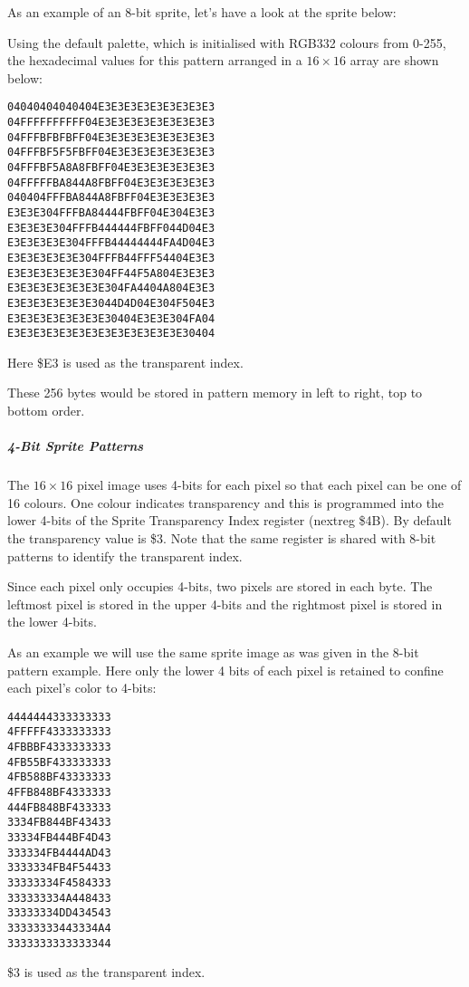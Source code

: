 As an example of an 8-bit sprite, let’s have a look at the sprite
below:

Using the default palette, which is initialised with RGB332 colours
from 0-255, the hexadecimal values for this pattern arranged in a
$16\times16$ array are shown below:

\begin{verbatim}
04040404040404E3E3E3E3E3E3E3E3E3
04FFFFFFFFFF04E3E3E3E3E3E3E3E3E3
04FFFBFBFBFF04E3E3E3E3E3E3E3E3E3
04FFFBF5F5FBFF04E3E3E3E3E3E3E3E3
04FFFBF5A8A8FBFF04E3E3E3E3E3E3E3
04FFFFFBA844A8FBFF04E3E3E3E3E3E3
040404FFFBA844A8FBFF04E3E3E3E3E3
E3E3E304FFFBA84444FBFF04E304E3E3
E3E3E3E304FFFB444444FBFF044D04E3
E3E3E3E3E304FFFB44444444FA4D04E3
E3E3E3E3E3E304FFFB44FFF54404E3E3
E3E3E3E3E3E3E304FF44F5A804E3E3E3
E3E3E3E3E3E3E3E304FA4404A804E3E3
E3E3E3E3E3E3E3044D4D04E304F504E3
E3E3E3E3E3E3E3E30404E3E3E304FA04
E3E3E3E3E3E3E3E3E3E3E3E3E3E30404

\end{verbatim}
Here \$E3 is used as the transparent index.

These 256 bytes would be stored in pattern memory in left to right,
top to bottom order.

\subparagraph{4-Bit Sprite Patterns}

The $16\times16$ pixel image uses 4-bits for each pixel so that each
pixel can be one of 16 colours. One colour indicates transparency and
this is programmed into the lower 4-bits of the Sprite Transparency
Index register (nextreg \$4B). By default the transparency value is
\$3. Note that the same register is shared with 8-bit patterns to
identify the transparent index.

Since each pixel only occupies 4-bits, two pixels are stored in each
byte. The leftmost pixel is stored in the upper 4-bits and the
rightmost pixel is stored in the lower 4-bits.

As an example we will use the same sprite image as was given in the
8-bit pattern example. Here only the lower 4 bits of each pixel is
retained to confine each pixel’s color to 4-bits:

\begin{verbatim}
4444444333333333
4FFFFF4333333333
4FBBBF4333333333
4FB55BF433333333
4FB588BF43333333
4FFB848BF4333333
444FB848BF433333
3334FB844BF43433
33334FB444BF4D43
333334FB4444AD43
3333334FB4F54433
33333334F4584333
333333334A448433
33333334DD434543
33333333443334A4
3333333333333344
\end{verbatim}

\$3 is used as the transparent index.

